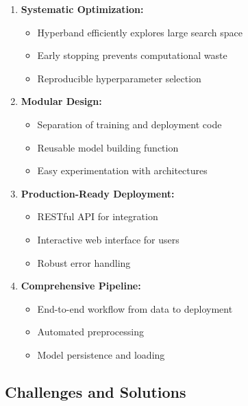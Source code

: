 \documentclass[12pt,a4paper]{article}
\begin{document}
\begin{enumerate}
    \item \textbf{Systematic Optimization:}
    \begin{itemize}
        \item Hyperband efficiently explores large search space
        \item Early stopping prevents computational waste
        \item Reproducible hyperparameter selection
    \end{itemize}
    
    \item \textbf{Modular Design:}
    \begin{itemize}
        \item Separation of training and deployment code
        \item Reusable model building function
        \item Easy experimentation with architectures
    \end{itemize}
    
    \item \textbf{Production-Ready Deployment:}
    \begin{itemize}
        \item RESTful API for integration
        \item Interactive web interface for users
        \item Robust error handling
    \end{itemize}
    
    \item \textbf{Comprehensive Pipeline:}
    \begin{itemize}
        \item End-to-end workflow from data to deployment
        \item Automated preprocessing
        \item Model persistence and loading
    \end{itemize}
\end{enumerate}

\subsection{Challenges and Solutions}
\end{document}
